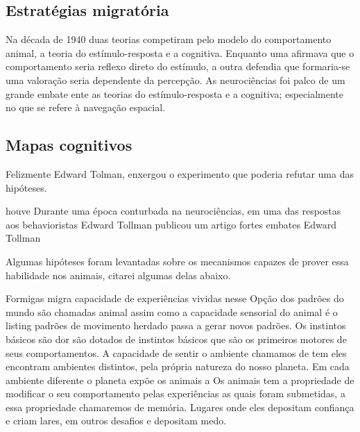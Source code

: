 \subsection{Estratégias migratória}

Na década de 1940 duas teorias competiram pelo modelo do comportamento animal, a teoria do estímulo-resposta e a cognitiva.
Enquanto uma afirmava que o comportamento seria reflexo direto do estímulo, a outra defendia que formaria-se uma valoração
seria dependente da percepção.
As neurociências foi palco de um grande embate ente as teorias do estímulo-resposta e a cognitiva; especialmente no que se refere à navegação espacial.

\subsection{Mapas cognitivos}
Felizmente Edward Tolman, enxergou o experimento que poderia refutar uma das hipóteses.\

houve Durante uma época conturbada na neurociências, em uma das respostas aos behavioristas Edward Tollman publicou um artigo  fortes embates Edward Tollman 

Algumas hipóteses foram levantadas sobre os mecanismos capazes de prover essa habilidade nos animais, citarei algumas delas abaixo.



Formigas
migra
capacidade de 
experiências vividas nesse 
Opção dos padrões do mundo são chamadas
animal assim como a capacidade sensorial do animal é o listing 
padrões de movimento herdado passa a gerar novos padrões.
Os instintos básicos são dor
são dotados de instintos básicos que são os primeiros motores de seus comportamentos.
A capacidade de sentir o ambiente chamamos de tem eles encontram ambientes distintos, pela própria natureza do nosso planeta.
Em cada ambiente diferente o planeta expõe os animais a
Os animais tem a propriedade de modificar o seu comportamento pelas experiências as quais foram submetidas, a essa propriedade chamaremos de memória.
Lugares onde eles depositam confiança e criam lares, em outros desafios e depositam medo.


